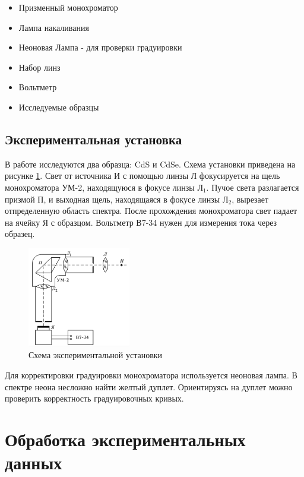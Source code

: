 \documentclass[a4paper, 14pt]{article}
\begin{document}
\begin{itemize}
    \item Призменный монохроматор 
    \item Лампа накаливания 
    \item Неоновая Лампа - для проверки градуировки
    \item Набор линз 
    \item Вольтметр
    \item Исследуемые образцы 
\end{itemize}

\subsection*{\textcolor{sub_header}{Экспериментальная установка}}

В работе исследуются два образца: CdS и CdSe. 
Схема установки приведена на рисунке \ref{pic:scheme}. 
Свет от источника И с помощью линзы Л фокусируется на щель монохроматора УМ-2, 
находящуюся в фокусе линзы Л$_1$. Пучое света разлагается призмой П, и выходная щель, находящаяся в фокусе линзы Л$_2$, вырезает отпределенную область спектра. После прохождения монохроматора свет падает на ячейку Я с образцом. Вольтметр В7-34 нужен для измерения тока через образец. 

\begin{figure}[h]

    \centering	
    \includegraphics[width=0.4\textwidth]{lab.png}
    \caption{Схема экспериментальной установки}
    \label{pic:scheme}
\end{figure} 

Для корректировки градуировки монохроматора используется неоновая лампа. В спектре неона несложно найти 
желтый дуплет. Ориентируясь на дуплет можно проверить корректность градуировочных кривых.


\section*{\textcolor{header}{Обработка экспериментальных данных}}
\end{document}
